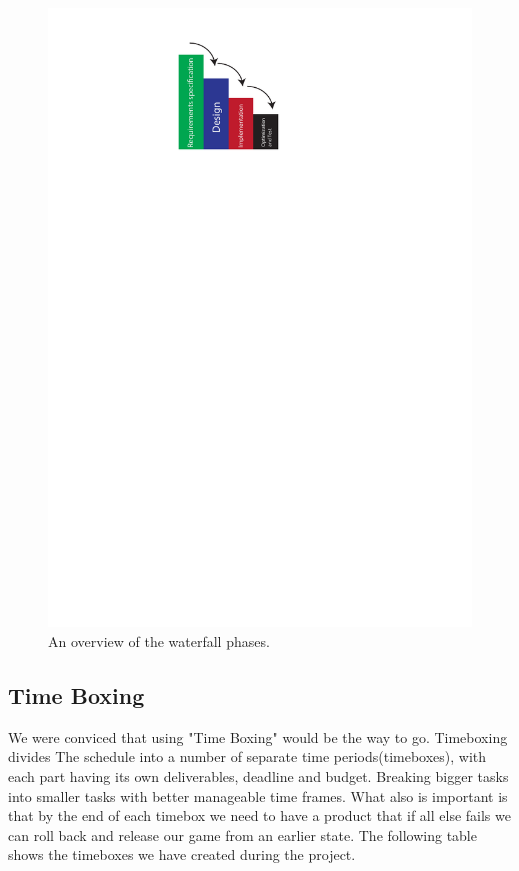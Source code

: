        \begin{figure}[h]
       \centering
       \includegraphics[scale=0.6]{Figures/Waterfall}
       \caption{An overview of the waterfall phases.}
       \label{fig:Waterfall}
       \end{figure}

       \newpage
       \subsection{Time Boxing} %
       We were conviced that using "Time Boxing" would be the way to go.
       Timeboxing divides The schedule into a number of separate time periods(timeboxes), with each part having its own deliverables, deadline and budget.
       Breaking bigger tasks into smaller tasks with better manageable time frames.
       What also is important is that by the end of each timebox we need to have a product that if all else fails we can roll back and release our game from an earlier state. The following table shows the timeboxes we have created during the project.


